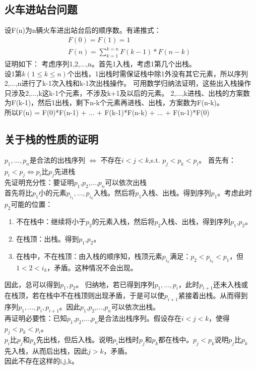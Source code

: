 \documentclass[UTF8]{ctexart}
\begin{document}
\section{}%
	\subsection{火车进站台问题}
		设F(n)为n辆火车进出站台后的顺序数。有递推式：
		\begin{gather*}
			F(0)=F(1)=1\\
			F(n)=\sum_{k=1}^{k=n}F(k-1)*F(n-k)
		\end{gather*}
		证明如下：
		考虑序列1,2,...,n。首先1入栈，考虑1第几个出栈。\\
		设1第$k(1\le k \le n)$个出栈，1出栈时需保证栈中除1外没有其它元素，所以序列2,...,n进行了k-1次入栈和k-1次出栈操作。
		可用数学归纳法证明，这些出入栈操作只涉及2,...,k这k-1个元素，不涉及k+1及以后的元素。
		2,...,k进栈、出栈的方案数为F(k-1)，然后1出栈，剩下n-k个元素再进栈、出栈，方案数为F(n-k)。\\
		所以F(n) = F(0)*F(n-1) + ... + F(k-1)*F(n-k) + ... + F(n-1)*F(0)
	\subsection{关于栈的性质的证明}
		$p_1,...,p_n$是合法的出栈序列 $\iff$ 不存在$i<j<k$,s.t. $p_j<p_k<p_i$。
		首先有：$p_i<p_j$$\iff$$p_i$比$p_j$先进栈\\
		先证明充分性：要证明$p_1$,$p_2$,...,$p_n$可以依次出栈\\
		首先将比$p_1$小的元素$p_{i_1},...,p_{i_k}$入栈。然后将$p_1$入栈、出栈。得到序列$p_1$。考虑此时$p_2$可能的位置：
		\begin{enumerate}
			\item 不在栈中：继续将小于$p_2$的元素入栈，然后将$p_2$入栈、出栈，得到序列$p_1$,$p_2$。
			\item 在栈顶：出栈。得到$p_1$,$p_2$。
			\item 在栈中，不在栈顶：由入栈的顺序知，栈顶元素$p_{i_k}$满足：$p_2<p_{i_k}<p_1$，但$1<2<i_k$，矛盾。这种情况不会出现。
		\end{enumerate}
		因此，总可以得到$p_1,p_2$。
		归纳地，若已得到序列$p_1,...,p_i$，此时$p_{i+1}$还未入栈或在栈顶，若在栈中不在栈顶则出现矛盾，于是可以使$p_{i+1}$紧接着出栈。从而得到序列$p_1,...,p_i,p_{i+1}$。因此$p_1$,$p_2$,...,$p_n$可以依次出栈。\\
		再证明必要性：已知$p_1$,$p_2$,...,$p_n$是合法出栈序列。假设存在$i<j<k$，使得$p_j<p_k<p_i$。\\
		$p_i$比$p_j$和$p_k$先出栈，但后入栈。说明$p_i$出栈时$p_j$和$p_k$都在栈中。$p_j<p_k$说明$p_j$比$p_k$先入栈，从而后出栈，因此$j>k$，矛盾。\\
		因此不存在这样的i,j,k。
\end{document}
